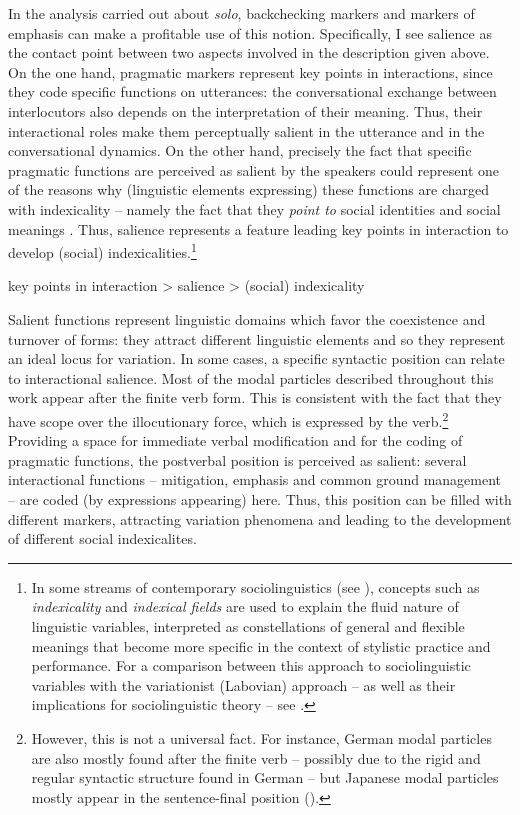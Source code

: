 In the analysis carried out about \textit{solo}, backchecking markers and markers of emphasis can make a profitable use of this notion. Specifically, I see salience as the contact point between two aspects involved in the description given above. On the one hand, pragmatic markers represent key points in interactions, since they code specific functions on utterances: the conversational exchange between interlocutors also depends on the interpretation of their meaning. Thus, their interactional roles make them perceptually salient in the utterance and in the conversational dynamics. On the other hand, precisely the fact that specific pragmatic functions are perceived as salient by the speakers could represent one of the reasons why (linguistic elements expressing) these functions are charged with indexicality – namely the fact that they \textit{point to} social identities and social meanings \citep{Silverstein2003}. Thus, salience represents a feature leading key points in interaction to develop (social) indexicalities.\footnote{In some streams of contemporary sociolinguistics (see \citealt{Eckert2008,Eckert2012}), concepts such as \textit{indexicality} and \textit{indexical fields} are used to explain the fluid nature of linguistic variables, interpreted as constellations of general and flexible meanings that become more specific in the context of stylistic practice and performance. For a comparison between this approach to sociolinguistic variables with the variationist (Labovian) approach – as well as their implications for sociolinguistic theory – see \citet{GuyHinskens2016}.}

\ea%
    \label{ex:key:107}

          key points in interaction > salience > (social) indexicality
    \z %

Salient functions represent linguistic domains which favor the coexistence and turnover of forms: they attract different linguistic elements and so they represent an ideal locus for variation.  In some cases, a specific syntactic position can relate to interactional salience. Most of the modal particles described throughout this work appear after the finite verb form. This is consistent with the fact that they have scope over the illocutionary force, which is expressed by the verb.\footnote{However, this is not a universal fact. For instance, German modal particles are also mostly found after the finite verb – possibly due to the rigid and regular syntactic structure found in German \citep{Abraham1991} – but Japanese modal particles mostly appear in the sentence-final position (\citealt{IzutsuIzutsu2013}).} Providing a space for immediate verbal modification and for the coding of pragmatic functions, the postverbal position is perceived as salient: several interactional functions – mitigation, emphasis and common ground management – are coded (by expressions appearing) here. Thus, this position can be filled with different markers, attracting variation phenomena and leading to the development of different social indexicalites.


